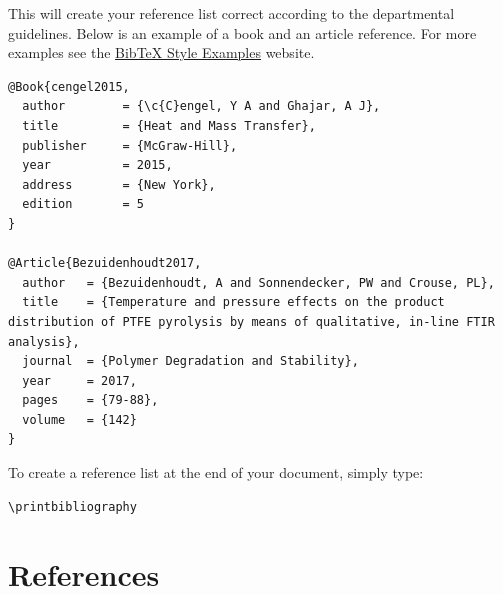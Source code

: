 \documentclass[a4paper,12pt]{article}
\begin{document}
This will create your reference list correct according to the departmental guidelines. Below is an example of a book and an article reference. For more examples see the \href{https://www.verbosus.com/bibtex-style-examples.html}{BibTeX Style Examples} website. 

\begin{lstlisting}
@Book{cengel2015,
  author		= {\c{C}engel, Y A and Ghajar, A J},
  title			= {Heat and Mass Transfer},
  publisher		= {McGraw-Hill},
  year			= 2015,
  address		= {New York},
  edition		= 5
}

@Article{Bezuidenhoudt2017,
  author   = {Bezuidenhoudt, A and Sonnendecker, PW and Crouse, PL},
  title	   = {Temperature and pressure effects on the product distribution of PTFE pyrolysis by means of qualitative, in-line FTIR analysis},
  journal  = {Polymer Degradation and Stability},
  year	   = 2017,
  pages	   = {79-88},
  volume   = {142}
}
\end{lstlisting}

To create a reference list at the end of your document, simply type: 
\begin{lstlisting}
\printbibliography
\end{lstlisting} 
\nocite{*}

\section{References}
\printbibliography[heading=none]
\end{document}
